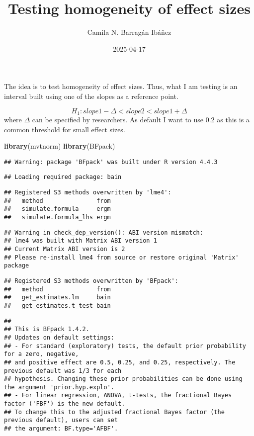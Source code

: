 \documentclass[
]{article}
\title{Testing homogeneity of effect sizes}
\author{Camila N. Barragán Ibáñez}
\date{2025-04-17}
\newenvironment{Shaded}{\begin{snugshade}}{\end{snugshade}}
\newcommand{\FunctionTok}[1]{\textcolor[rgb]{0.13,0.29,0.53}{\textbf{#1}}}
\newcommand{\NormalTok}[1]{#1}
\begin{document}
\maketitle

The idea is to test homogeneity of effect sizes. Thus, what I am testing
is an interval built using one of the slopes as a reference point.

\[H_1: slope1-\Delta <slope2 < slope1+\Delta\] where \(\Delta\) can be
specified by researchers. As default I want to use 0.2 as this is a
common threshold for small effect sizes.

\begin{Shaded}
\begin{Highlighting}[]
\FunctionTok{library}\NormalTok{(mvtnorm)}
\FunctionTok{library}\NormalTok{(BFpack)}
\end{Highlighting}
\end{Shaded}

\begin{verbatim}
## Warning: package 'BFpack' was built under R version 4.4.3
\end{verbatim}

\begin{verbatim}
## Loading required package: bain
\end{verbatim}

\begin{verbatim}
## Registered S3 methods overwritten by 'lme4':
##   method               from
##   simulate.formula     ergm
##   simulate.formula_lhs ergm
\end{verbatim}

\begin{verbatim}
## Warning in check_dep_version(): ABI version mismatch: 
## lme4 was built with Matrix ABI version 1
## Current Matrix ABI version is 2
## Please re-install lme4 from source or restore original 'Matrix' package
\end{verbatim}

\begin{verbatim}
## Registered S3 methods overwritten by 'BFpack':
##   method               from
##   get_estimates.lm     bain
##   get_estimates.t_test bain
\end{verbatim}

\begin{verbatim}
## 
## This is BFpack 1.4.2.
## Updates on default settings:
## - For standard (exploratory) tests, the default prior probability for a zero, negative,
## and positive effect are 0.5, 0.25, and 0.25, respectively. The previous default was 1/3 for each
## hypothesis. Changing these prior probabilities can be done using the argument 'prior.hyp.explo'.
## - For linear regression, ANOVA, t-tests, the fractional Bayes factor ('FBF') is the new default.
## To change this to the adjusted fractional Bayes factor (the previous default), users can set
## the argument: BF.type='AFBF'.
\end{verbatim}
\end{document}
